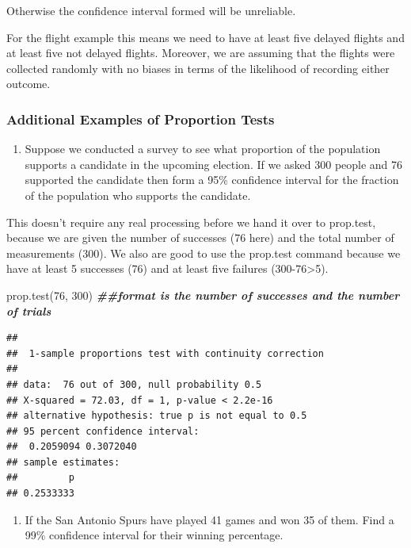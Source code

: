 \documentclass[
]{book}
\newenvironment{Shaded}{\begin{snugshade}}{\end{snugshade}}
\newcommand{\DecValTok}[1]{\textcolor[rgb]{0.00,0.00,0.81}{#1}}
\newcommand{\DocumentationTok}[1]{\textcolor[rgb]{0.56,0.35,0.01}{\textbf{\textit{#1}}}}
\newcommand{\FunctionTok}[1]{\textcolor[rgb]{0.00,0.00,0.00}{#1}}
\newcommand{\NormalTok}[1]{#1}
\providecommand{\tightlist}{%
  \setlength{\itemsep}{0pt}\setlength{\parskip}{0pt}}
\theoremstyle{definition}
\theoremstyle{definition}
\theoremstyle{definition}
\theoremstyle{definition}
\theoremstyle{remark}
\begin{document}
Otherwise the confidence interval formed will be unreliable.

For the flight example this means we need to have at least five delayed flights and at least five not delayed flights. Moreover, we are assuming that the flights were collected randomly with no biases in terms of the likelihood of recording either outcome.

\hypertarget{additional-examples-of-proportion-tests}{%
\subsubsection{Additional Examples of Proportion Tests}\label{additional-examples-of-proportion-tests}}

\begin{enumerate}
\def\labelenumi{\arabic{enumi}.}
\tightlist
\item
  Suppose we conducted a survey to see what proportion of the population supports a candidate in the upcoming election. If we asked 300 people and 76 supported the candidate then form a 95\% confidence interval for the fraction of the population who supports the candidate.
\end{enumerate}

This doesn't require any real processing before we hand it over to prop.test, because we are given the number of successes (76 here) and the total number of measurements (300). We also are good to use the prop.test command because we have at least 5 successes (76) and at least five failures (300-76\textgreater5).

\begin{Shaded}
\begin{Highlighting}[]
\FunctionTok{prop.test}\NormalTok{(}\DecValTok{76}\NormalTok{, }\DecValTok{300}\NormalTok{)  }\DocumentationTok{\#\#format is the number of successes and the number of trials}
\end{Highlighting}
\end{Shaded}

\begin{verbatim}
## 
##  1-sample proportions test with continuity correction
## 
## data:  76 out of 300, null probability 0.5
## X-squared = 72.03, df = 1, p-value < 2.2e-16
## alternative hypothesis: true p is not equal to 0.5
## 95 percent confidence interval:
##  0.2059094 0.3072040
## sample estimates:
##         p 
## 0.2533333
\end{verbatim}

\begin{enumerate}
\def\labelenumi{\arabic{enumi}.}
\setcounter{enumi}{1}
\tightlist
\item
  If the San Antonio Spurs have played 41 games and won 35 of them. Find a 99\% confidence interval for their winning percentage.
\end{enumerate}
\end{document}
